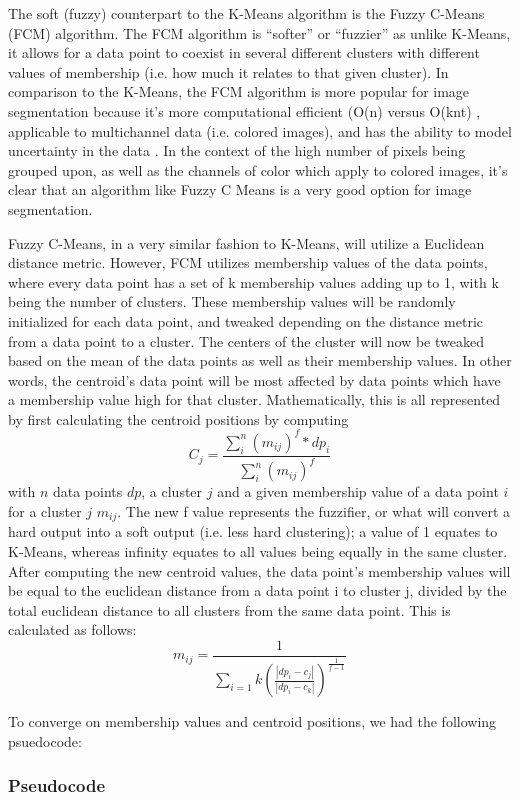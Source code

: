 \documentclass[10pt,twocolumn]{article}
\begin{document}
The soft (fuzzy) counterpart to the K-Means algorithm is the Fuzzy C-Means (FCM) algorithm. The FCM algorithm is “softer” or “fuzzier” as unlike K-Means, it allows for a data point to coexist in several different clusters with different values of membership (i.e. how much it relates to that given cluster). In comparison to the K-Means, the FCM algorithm is more popular for image segmentation because it’s more computational efficient (O(n) versus O(knt) \cite{Mittal2021}, applicable to multichannel data (i.e. colored images), and has the ability to model uncertainty in the data \cite{Roy2014}. In the context of the high number of pixels being grouped upon, as well as the channels of color which apply to colored images, it’s clear that an algorithm like Fuzzy C Means is a very good option for image segmentation.

Fuzzy C-Means, in a very similar fashion to K-Means, will utilize a Euclidean distance metric. However, FCM utilizes membership values of the data points, where every data point has a set of k membership values adding up to 1, with k being the number of clusters. These membership values will be randomly initialized for each data point, and tweaked depending on the distance metric from a data point to a cluster. The centers of the cluster will now be tweaked based on the mean of the data points as well as their membership values. In other words, the centroid’s data point will be most affected by data points which have a membership value high for that cluster. Mathematically, this is all represented by first calculating the centroid positions by computing \[ C_j = \frac{ \sum_{i}^{n} (m_{ij})^f * dp_i  }{  \sum_{i}^{n} (m_{ij})^f  }\] with \(n\) data points \(dp\), a cluster \(j\) and a given membership value of a data point \(i\) for a cluster \(j\) \(m_{ij}\). The new f value represents the fuzzifier, or what will convert a hard output into a soft output (i.e. less hard clustering); a value of 1 equates to K-Means, whereas infinity equates to all values being equally in the same cluster. After computing the new centroid values, the data point’s membership values will be equal to the euclidean distance from a data point i to cluster j, divided by the total euclidean distance to all clusters from the same data point. This is calculated as follows: \[m_{ij} = \frac{1}{\sum_{i=1}{k} (\frac{|dp_i - c_j|}{|dp_i - c_k|})^{\frac{1}{f-1}}} \]

To converge on membership values and centroid positions, we had the following psuedocode:

\subsubsection {Pseudocode}
\end{document}

